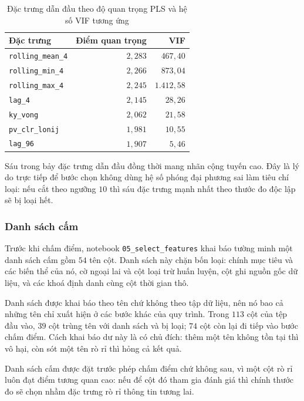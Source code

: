 \documentclass[12pt, a4paper]{report}
\begin{document}
\begin{table}[htbp]
\centering
\caption{Đặc trưng dẫn đầu theo độ quan trọng PLS và hệ số VIF tương ứng}
\label{tab:pls}
\small
\begin{tabular}{l r r}
\toprule
\textbf{Đặc trưng} & \textbf{Điểm quan trọng} & \textbf{VIF} \\
\midrule
\texttt{rolling\_mean\_4} & $2{,}283$ & $467{,}40$ \\
\texttt{rolling\_min\_4}  & $2{,}266$ & $873{,}04$ \\
\texttt{rolling\_max\_4}  & $2{,}245$ & $1.412{,}58$ \\
\texttt{lag\_4}          & $2{,}145$ & $28{,}26$ \\
\texttt{ky\_vong}        & $2{,}062$ & $21{,}58$ \\
\texttt{pv\_clr\_lonij}   & $1{,}981$ & $10{,}55$ \\
\texttt{lag\_96}         & $1{,}907$ & $5{,}46$ \\
\bottomrule
\end{tabular}


\end{table}

Sáu trong bảy đặc trưng dẫn đầu đồng thời mang nhãn cộng tuyến cao. Đây là lý do trực tiếp để
bước chọn không dùng hệ số phóng đại phương sai làm tiêu chí loại: nếu cắt theo ngưỡng $10$ thì
sáu đặc trưng mạnh nhất theo thước đo độc lập sẽ bị loại hết.

\subsubsection{Danh sách cấm}

Trước khi chấm điểm, notebook \texttt{05\_select\_features} khai báo tường minh một danh sách cấm
gồm $54$ tên cột. Danh sách này chặn bốn loại: chính mục tiêu và các biến thể của nó, cờ ngoại
lai và cột loại trừ huấn luyện, cột ghi nguồn gốc dữ liệu, và các khoá định danh cùng cột thời
gian thô.

Danh sách được khai báo theo tên chứ không theo tập dữ liệu, nên nó bao cả những tên chỉ xuất
hiện ở các bước khác của quy trình. Trong $113$ cột của tệp đầu vào, $39$ cột trùng tên với
danh sách và bị loại; $74$ cột còn lại đi tiếp vào bước chấm điểm. Cách khai báo dư này là có
chủ đích: thêm một tên không tồn tại thì vô hại, còn sót một tên rò rỉ thì hỏng cả kết quả.

Danh sách cấm được đặt trước phép chấm điểm chứ không sau, vì một cột rò rỉ luôn đạt điểm tương quan cao: nếu để cột đó tham gia đánh giá thì chính thước đo sẽ chọn nhầm đặc trưng rò rỉ thông tin tương lai.
\end{document}
